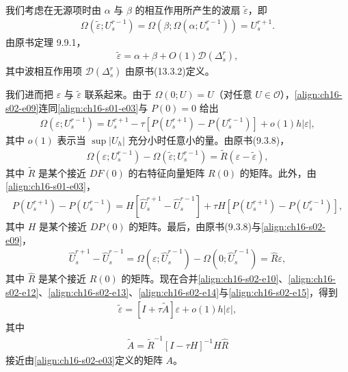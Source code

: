 \documentclass[../../main.tex]{subfiles}
\begin{document}
我们考虑在无源项时由 $\alpha$ 与 $\beta$ 的相互作用所产生的波扇 $\tilde\varepsilon$，即
\begin{align}
\Omega(\tilde\varepsilon;U_s^{r-1})=\Omega(\beta;\Omega(\alpha;U_s^{r-1}))=U_s^{r+1}.
\label{align:ch16-s02-e10}
\end{align}
由原书定理 9.9.1，
\begin{align}
\tilde\varepsilon=\alpha+\beta+O(1)\mathscr{D}(\Delta_s^r),
\label{align:ch16-s02-e11}
\end{align}
其中波相互作用项 $\mathscr{D}(\Delta_s^r)$ 由原书(13.3.2)定义。

我们进而把 $\varepsilon$ 与 $\tilde\varepsilon$ 联系起来。由于 $\Omega(0;U)=U$（对任意 $U\in\mathscr{O}$），\eqref{align:ch16-s02-e09}连同\eqref{align:ch16-s01-e03}与 $P(0)=0$ 给出
\begin{align}
\Omega(\varepsilon;U_s^{r-1})=U_s^{r+1}-\tau[P(U_s^{r+1})-P(U_s^{r-1})]+o(1)h|\varepsilon|,
\label{align:ch16-s02-e12}
\end{align}
其中 $o(1)$ 表示当 $\sup|U_h|$ 充分小时任意小的量。由原书(9.3.8)，
\begin{align}
\Omega(\varepsilon;U_s^{r-1})-\Omega(\tilde\varepsilon;U_s^{r-1})=\tilde R(\varepsilon-\tilde\varepsilon),
\label{align:ch16-s02-e13}
\end{align}
其中 $\tilde R$ 是某个接近 $DF(0)$ 的右特征向量矩阵 $R(0)$ 的矩阵。此外，由\eqref{align:ch16-s01-e03}，
\begin{align}
P(U_s^{r+1})-P(U_s^{r-1})=H[\hat U_s^{r+1}-\hat U_s^{r-1}]+\tau H[P(U_s^{r+1})-P(U_s^{r-1})],
\label{align:ch16-s02-e14}
\end{align}
其中 $H$ 是某个接近 $DP(0)$ 的矩阵。最后，由原书(9.3.8)与\eqref{align:ch16-s02-e09}，
\begin{align}
\hat U_s^{r+1}-\hat U_s^{r-1}=\Omega(\varepsilon;\hat U_s^{r-1})-\Omega(0;\hat U_s^{r-1})=\hat R\varepsilon,
\label{align:ch16-s02-e15}
\end{align}
其中 $\hat R$ 是某个接近 $R(0)$ 的矩阵。现在合并\eqref{align:ch16-s02-e10}、\eqref{align:ch16-s02-e12}、\eqref{align:ch16-s02-e13}、\eqref{align:ch16-s02-e14}与\eqref{align:ch16-s02-e15}，得到
\begin{align}
\tilde\varepsilon=[I+\tau\tilde A]\varepsilon+o(1)h|\varepsilon|,
\label{align:ch16-s02-e16}
\end{align}
其中
\begin{align}
\tilde A=\tilde R^{-1}[I-\tau H]^{-1}H\hat R
\label{align:ch16-s02-e17}
\end{align}
接近由\eqref{align:ch16-s02-e03}定义的矩阵 $A$。
\end{document}
